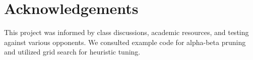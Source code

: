 \documentclass[11pt]{article}
\begin{document}
\section*{Acknowledgements}
This project was informed by class discussions, academic resources, and testing against various opponents. We consulted example code for alpha-beta pruning and utilized grid search for heuristic tuning.
\end{document}
